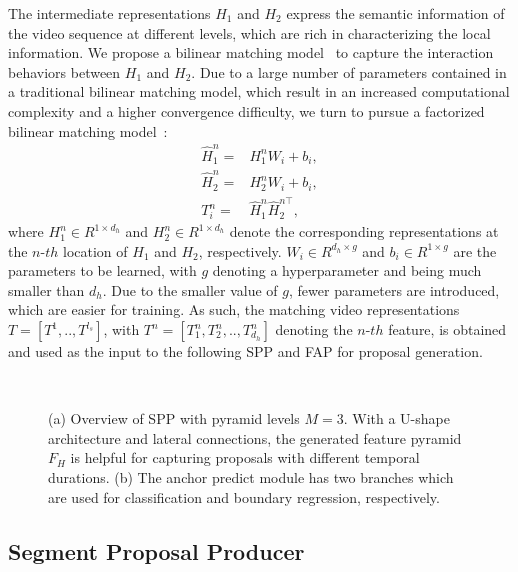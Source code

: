 \documentclass[10pt,twocolumn,letterpaper]{article}
\begin{document}
The intermediate representations $H_{1}$ and $H_{2}$ express the semantic information of the video sequence at different levels, which are rich in characterizing the local information. We propose a bilinear matching model~\cite{bilinear_old} to capture the interaction behaviors between $H_1$ and $H_2$. Due to a large number of parameters contained in a traditional bilinear matching model, which result in an increased computational complexity and a higher convergence difficulty, 
we turn to pursue a  factorized bilinear matching model~\cite{bilinear_new,fengyang}:
\begin{equation}
\begin{split}
    \hat{H}_{1}^{n} =& H_{1}^{n}W_{i}+b_{i},\\
    \hat{H}_{2}^{n} =& H_{2}^{n}W_{i}+b_{i},\\
    T_{i}^{n} =& \hat{H}_{1}^{n}\hat{H}_{2}^{n\top},
\end{split}
\end{equation}
where $H_{1}^{n}\in R^{1\times d_{h}}$ and $H_{2}^{n}\in
R^{1\times d_{h}}$ denote the corresponding representations at the $n$-$th$ location of $H_{1}$ and $H_{2}$, respectively. $W_{i}\in R^{d_{h}\times g}$ and $b_{i}\in R^{1\times g}$ are the parameters to be learned, with $g$ denoting a hyperparameter and being much smaller than $d_{h}$. Due to the smaller value of $g$, fewer parameters are introduced, which are easier for training. As such, the matching video representations $T=[T^{1},..,T^{l_s}]$, with $T^{n}=[T_{1}^{n},T_{2}^{n},..,T_{d_{h}}^{n}]$ denoting the $n$-$th$ feature, is obtained and used as the input to the following SPP and FAP for proposal generation. 


\begin{figure}[!t]
\centering
{}\\
\caption{(a) Overview of SPP with pyramid levels $M=3$. With a U-shape architecture and lateral connections, the generated  feature pyramid $F_H$ is helpful for capturing proposals with different temporal durations. (b) The anchor predict module has two branches which are used for classification and boundary regression, respectively.}
\label{segment actionness}
\end{figure}

\subsection{Segment Proposal Producer}
\label{section3.3}
\end{document}
